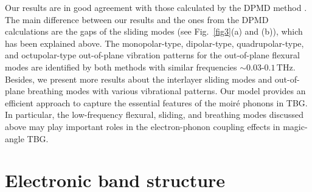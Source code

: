 \documentclass[aps,prx,10pt,twocolumn,superscriptaddress]{revtex4}
\begin{document}
Our results are in good agreement with those calculated by the DPMD method \cite{liu-phonon-nano22}. %
The main difference between our results and the ones from the DPMD calculations are the gaps of the sliding modes (see Fig.~\ref{fig3}(a) and (b)), which has been explained above. The monopolar-type, dipolar-type, quadrupolar-type, and octupolar-type out-of-plane vibration patterns for the out-of-plane flexural modes are identified by both methods with similar frequencies $\sim0.03\textrm{-}0.1\,$THz. Besides, we present more results about the interlayer sliding modes and out-of-plane breathing modes with various vibrational patterns.
Our model provides an efficient approach to capture the essential features of the moir\'e phonons in TBG. In particular, the low-frequency flexural, sliding, and breathing modes discussed above may play important roles in the electron-phonon coupling effects in magic-angle TBG. 


\section{Electronic band structure}
\end{document}
